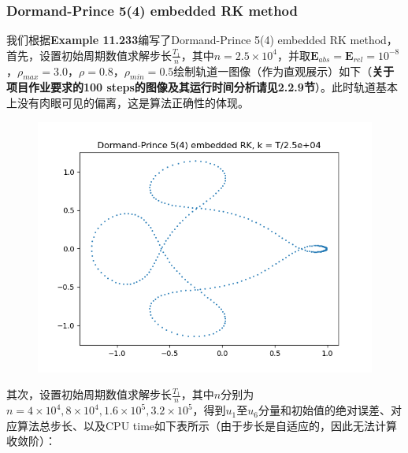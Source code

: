 \documentclass{ctexart}
\begin{document}
\begin{sloppypar}
\subsubsection{Dormand-Prince 5(4) embedded RK method}
我们根据\textbf{Example 11.233}编写了Dormand-Prince 5(4) embedded RK method，首先，设置初始周期数值求解步长$\frac{T_1}{n}$，其中$n = 2.5 \times 10^4$，并取$\mathbf{E}_{abs}=\mathbf{E}_{rel}=10^{-8}$，$\rho_{max}=3.0$，$\rho = 0.8$，$\rho_{min} = 0.5$绘制轨道一图像（作为直观展示）如下（\textbf{关于项目作业要求的100 steps的图像及其运行时间分析请见2.2.9节}）。此时轨道基本上没有肉眼可见的偏离，这是算法正确性的体现。
\begin{figure}[H]
\centering
\includegraphics[scale = 0.45]{./report_src/Figure_36.png}
\end{figure}
其次，设置初始周期数值求解步长$\frac{T_1}{n}$，其中$n$分别为$n = 4 \times 10^4,8 \times 10^4,1.6 \times 10^5, 3.2 \times 10^5$，得到$u_1$至$u_6$分量和初始值的绝对误差、对应算法总步长、以及CPU time如下表所示（由于步长是自适应的，因此无法计算收敛阶）：


\end{sloppypar}
\end{document}
